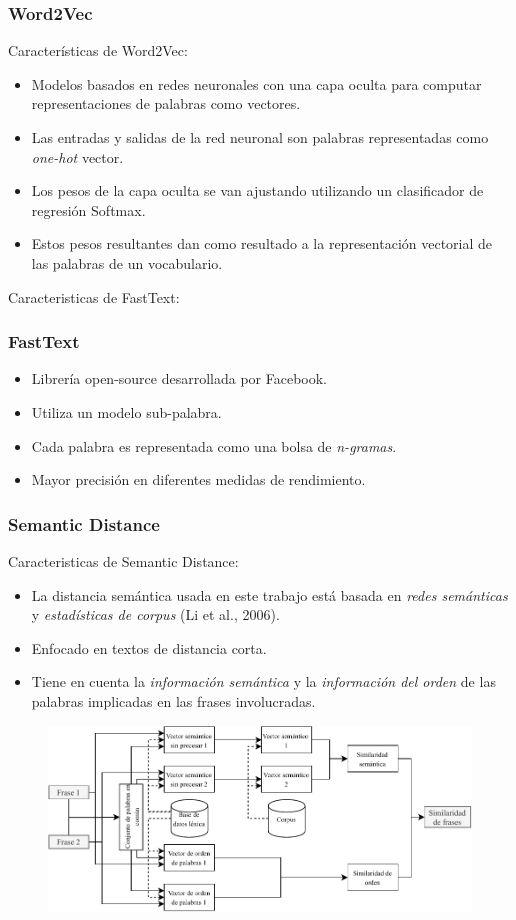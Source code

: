 \begin{frame}
	\frametitle{Word2Vec}
	Características de Word2Vec:
	\bigskip
	\begin{itemize}[<*>]
		\item Modelos basados en redes neuronales con una capa oculta para computar representaciones de palabras como vectores.
		\item Las entradas y salidas de la red neuronal son palabras representadas como \textit{one-hot} vector.
		\item Los pesos de la capa oculta se van ajustando utilizando un clasificador de regresión Softmax.
		\item Estos pesos resultantes dan como resultado a la representación vectorial de las palabras de un vocabulario.
	\end{itemize}
\end{frame}

\begin{frame}
	Caracteristicas de FastText:
	\bigskip
	\frametitle{FastText}
	\begin{itemize}[<*>]
		\item Librería open-source desarrollada por Facebook.
		\item Utiliza un modelo sub-palabra.
		\item Cada palabra es representada como una bolsa de \textit{n-gramas}.
		\item Mayor precisión en diferentes medidas de rendimiento.
	\end{itemize}
\end{frame}

\begin{frame}
	\frametitle{Semantic Distance}
	Caracteristicas de Semantic Distance:
	\bigskip
	\begin{itemize}[<*>]
		\item La distancia semántica usada en este trabajo está basada en \textit{redes semánticas} y \textit{estadísticas de corpus} (Li et al., 2006).
		\item Enfocado en textos de distancia corta.
		\item Tiene en cuenta la \textit{información semántica} y la \textit{información del orden} de las palabras implicadas en las frases involucradas.
	\end{itemize}

	\begin{figure}
		\centering
		\includegraphics[width=0.7\linewidth]{../7_marco_teorico/imagenes/similaridad_sematinca_metodo}
		\label{fig:similaridadsematincametodo}
	\end{figure}
\end{frame}

